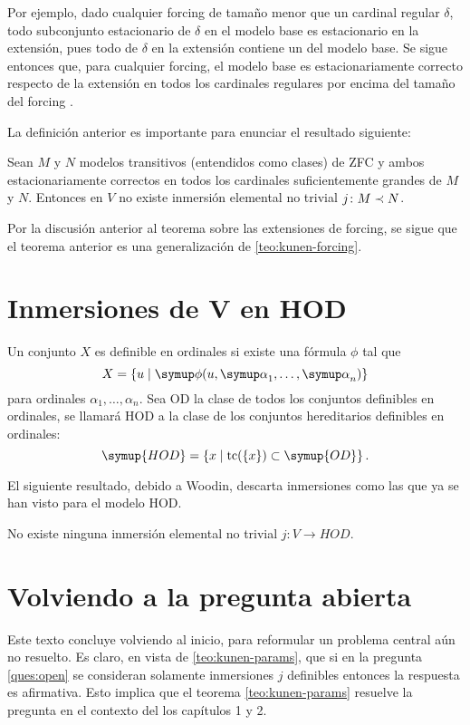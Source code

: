 Por ejemplo, dado cualquier forcing de tamaño menor que un cardinal regular $\delta$,
todo subconjunto estacionario de $\delta$ en el modelo base es estacionario en la extensión,
pues todo \cna{} de $\delta$ en la extensión contiene un \cna{} del modelo base.
Se sigue entonces que, para cualquier forcing, el modelo base es estacionariamente correcto
respecto de la extensión en todos los cardinales regulares por encima del tamaño del forcing
\autocite[1878]{hamkins_generalizations_2012}.

La definición anterior es importante para enunciar el resultado siguiente:

\begin{teo}
    Sean $M$ y $N$ modelos transitivos (entendidos como clases) de ZFC y ambos
    estacionariamente correctos en todos los cardinales suficientemente grandes
    de $M$ y $N$. Entonces en $V$ no existe inmersión elemental no trivial
    $j\colon M\prec N$.
\end{teo}

Por la discusión anterior al teorema sobre las extensiones de forcing,
se sigue que el teorema anterior es una generalización de \ref{teo:kunen-forcing}.

\section{Inmersiones de $\symbf{V}$ en HOD}

Un conjunto $X$ es definible en ordinales si existe una fórmula $\phi$
tal que
\[
    X = \set{u\mid \phi(u, \alpha_1,\dots,\alpha_n)}
\]
para ordinales $\alpha_1,\dots,\alpha_n$. Sea OD la clase de todos
los conjuntos definibles en ordinales, se llamará HOD a la clase de
los conjuntos hereditarios definibles en ordinales:
\[
    \symup{HOD} = \set{x\mid \tc(\set{x})\subset \symup{OD}}.
\]

El siguiente resultado, debido a Woodin, descarta inmersiones
como las que ya se han visto para el modelo HOD.

\begin{teo}
    No existe ninguna inmersión elemental no trivial $j\colon V\to HOD$.
\end{teo}

\section{Volviendo a la pregunta abierta}

Este texto concluye volviendo al inicio, para reformular un
problema central aún no resuelto.
Es claro, en vista de \ref{teo:kunen-params}, que si en la pregunta
\ref{ques:open} se consideran solamente inmersiones $j$ definibles
entonces la respuesta es afirmativa. Esto implica
que el teorema \ref{teo:kunen-params} resuelve la pregunta
en el contexto del los capítulos 1 y 2.

